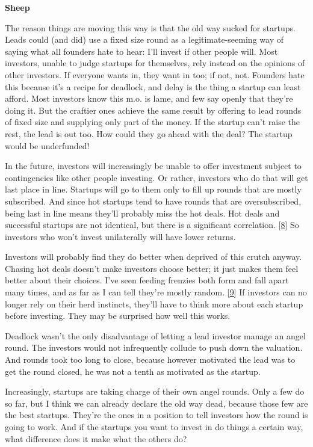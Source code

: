 \textbf{Sheep}

The reason things are moving this way is that the old way sucked
for startups.  Leads could (and did) use a fixed size round as a
legitimate-seeming way of saying what all founders hate to hear:
I'll invest if other people will.  Most investors, unable to judge
startups for themselves, rely instead on the opinions of other
investors.  If everyone wants in, they want in too; if not, not.
Founders hate this because it's a recipe for deadlock, and delay
is the thing a startup can least afford.  Most investors know this
m.o. is lame, and few say openly that they're doing it.  But the
craftier ones achieve the same result by offering to lead rounds
of fixed size and supplying only part of the money.  If the startup
can't raise the rest, the lead is out too.  How could they go ahead
with the deal?  The startup would be underfunded!

In the future, investors will increasingly be unable to offer
investment subject to contingencies like other people investing.
Or rather, investors who do that will get last place in line.
Startups will go to them only to fill up rounds that are mostly
subscribed.  And since hot startups tend to have rounds that are
oversubscribed, being last in line means they'll probably miss the
hot deals.  Hot deals and successful startups are not identical,
but there is a significant correlation. 
[\href{\#f8n}{8}]
So investors who won't invest unilaterally will have lower returns.

Investors will probably find they do better when deprived of this
crutch anyway.   Chasing hot deals doesn't make investors choose
better; it just makes them feel better about their choices.  I've
seen feeding frenzies both form and fall apart many times, and as
far as I can tell they're mostly random. 
[\href{\#f9n}{9}]
If investors can
no longer rely on their herd instincts, they'll have to think more
about each startup before investing.  They may be surprised how
well this works.

Deadlock wasn't the only disadvantage of letting a lead investor
manage an angel round.  The investors would not infrequently collude
to push down the valuation.  And rounds took too long to close,
because however motivated the lead was to get the round closed, he
was not a tenth as motivated as the startup.

Increasingly, startups are taking charge of their own angel rounds.
Only a few do so far, but I think we can already declare the old
way dead, because those few are the best startups.  They're the
ones in a position to tell investors how the round is going to work.
And if the startups you want to invest in do things a certain way,
what difference does it make what the others do?

